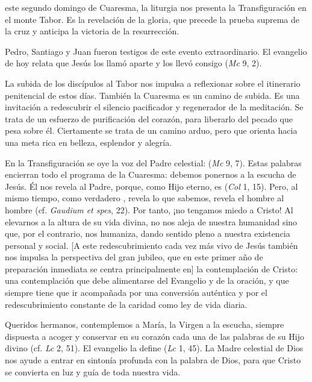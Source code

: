 \begin{body}
 este segundo domingo de Cuaresma, la liturgia nos presenta la Transfiguración en el monte Tabor. Es la revelación de la gloria, que precede la prueba suprema de la cruz y anticipa la victoria de la resurrección.

Pedro, Santiago y Juan fueron testigos de este evento extraordinario. El evangelio de hoy relata que Jesús los llamó aparte y los llevó consigo  (\textit{Mc} 9, 2).

La subida de los discípulos al Tabor nos impulsa a reflexionar sobre el itinerario penitencial de estos días. También la Cuaresma es un camino de subida. Es una invitación a redescubrir el silencio pacificador y regenerador de la meditación. Se trata de un esfuerzo de purificación del corazón, para liberarlo del pecado que pesa sobre él. Ciertamente se trata de un camino arduo, pero que orienta hacia una meta rica en belleza, esplendor y alegría.

En la Transfiguración se oye la voz del Padre celestial:  (\textit{Mc} 9, 7). Estas palabras encierran todo el programa de la Cuaresma: debemos ponernos a la escucha de Jesús. Él nos revela al Padre, porque, como Hijo eterno, es  (\textit{Col} 1, 15). Pero, al mismo tiempo, como verdadero , revela lo que sabemos, revela el hombre al hombre (cf. \textit{Gaudium et spes}, 22). Por tanto, ¡no tengamos miedo a Cristo! Al elevarnos a la altura de su vida divina, no nos aleja de nuestra humanidad sino que, por el contrario, nos humaniza, dando sentido pleno a nuestra existencia personal y social. [A este redescubrimiento cada vez más vivo de Jesús también nos impulsa la perspectiva del gran jubileo, que en este primer año de preparación inmediata se centra principalmente en] la contemplación de Cristo: una contemplación que debe alimentarse del Evangelio y de la oración, y que siempre tiene que ir acompañada por una conversión auténtica y por el redescubrimiento constante de la caridad como ley de vida diaria.

Queridos hermanos, contemplemos a María, la Virgen a la escucha, siempre dispuesta a acoger y conservar en su corazón cada una de las palabras de su Hijo divino (cf. \textit{Lc} 2, 51). El evangelio la define  (\textit{Lc} 1, 45). La Madre celestial de Dios nos ayude a entrar en sintonía profunda con la palabra de Dios, para que Cristo se convierta en luz y guía de toda nuestra vida.
\end{body}

